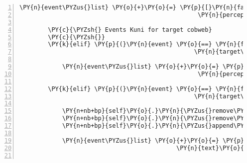 \begin{Verbatim}[commandchars=\\\{\},numbers=left,firstnumber=1,stepnumber=1]
            \PY{n}{event\PYZus{}list} \PY{o}{+}\PY{o}{=} \PY{p}{[}\PY{n}{fabula}\PY{o}{.}\PY{n}{PerceptionEvent}\PY{p}{(}\PY{n}{identifier}\PY{o}{=}\PY{n}{ID\PYZus{}KUNI}\PY{p}{,}
                                                  \PY{n}{perception}\PY{o}{=}\PY{l+s}{\PYZsq{}}\PY{l+s}{Der Abflugsort ist schon offen.}\PY{l+s}{\PYZsq{}}\PY{p}{)}\PY{p}{]}

        \PY{c}{\PYZsh{} Events Kuni for target cobweb}
        \PY{c}{\PYZsh{}}
        \PY{k}{elif} \PY{p}{(}\PY{n}{event} \PY{o}{==} \PY{n}{fabula}\PY{o}{.}\PY{n}{TriesToLookAtEvent}\PY{p}{(}\PY{n}{identifier}\PY{o}{=}\PY{n}{ID\PYZus{}KUNI}\PY{p}{,}
                                                 \PY{n}{target\PYZus{}identifier}\PY{o}{=}\PY{l+s}{\PYZsq{}}\PY{l+s}{cobweb}\PY{l+s}{\PYZsq{}}\PY{p}{)}\PY{p}{)}\PY{p}{:}

            \PY{n}{event\PYZus{}list} \PY{o}{+}\PY{o}{=} \PY{p}{[}\PY{n}{fabula}\PY{o}{.}\PY{n}{PerceptionEvent}\PY{p}{(}\PY{n}{identifier}\PY{o}{=}\PY{n}{ID\PYZus{}KUNI}\PY{p}{,}
                                                  \PY{n}{perception}\PY{o}{=}\PY{l+s}{\PYZsq{}}\PY{l+s}{Ein klebriger Spinnenweb, könnte nützlich sein.}\PY{l+s}{\PYZsq{}}\PY{p}{)}\PY{p}{]}

        \PY{k}{elif} \PY{p}{(}\PY{n}{event} \PY{o}{==} \PY{n}{fabula}\PY{o}{.}\PY{n}{TriesToPickUpEvent}\PY{p}{(}\PY{n}{identifier}\PY{o}{=}\PY{n}{ID\PYZus{}KUNI}\PY{p}{,}
                                                 \PY{n}{target\PYZus{}identifier}\PY{o}{=}\PY{l+s}{\PYZsq{}}\PY{l+s}{cobweb}\PY{l+s}{\PYZsq{}}\PY{p}{)}\PY{p}{)}\PY{p}{:}

            \PY{n+nb+bp}{self}\PY{o}{.}\PY{n}{\PYZus{}remove\PYZus{}sentence}\PY{p}{(}\PY{n}{ID\PYZus{}KUNI}\PY{p}{,} \PY{l+s}{\PYZsq{}}\PY{l+s}{Hinter der Spinne ist doch irgendwas!}\PY{l+s}{\PYZsq{}}\PY{p}{)}
            \PY{n+nb+bp}{self}\PY{o}{.}\PY{n}{\PYZus{}remove\PYZus{}sentence}\PY{p}{(}\PY{n}{ID\PYZus{}CASSANDRA}\PY{p}{,} \PY{l+s}{\PYZsq{}}\PY{l+s}{Die Spinne verbirgt etwas!}\PY{l+s}{\PYZsq{}}\PY{p}{)}
            \PY{n+nb+bp}{self}\PY{o}{.}\PY{n}{\PYZus{}append\PYZus{}sentence}\PY{p}{(}\PY{n}{ID\PYZus{}KUNI}\PY{p}{,} \PY{l+s}{\PYZsq{}}\PY{l+s}{Ich habe einen sehr klebrigen Spinnweb dabei.}\PY{l+s}{\PYZsq{}}\PY{p}{)}

            \PY{n}{event\PYZus{}list} \PY{o}{+}\PY{o}{=} \PY{p}{[}\PY{n}{fabula}\PY{o}{.}\PY{n}{SaysEvent}\PY{p}{(}\PY{n}{identifier}\PY{o}{=}\PY{n}{ID\PYZus{}KUNI}\PY{p}{,}
                                            \PY{n}{text}\PY{o}{=}\PY{l+s}{\PYZsq{}}\PY{l+s}{Hey, die Spinne geht weg!}\PY{l+s}{\PYZsq{}}\PY{p}{)}\PY{p}{]}


\end{Verbatim}
